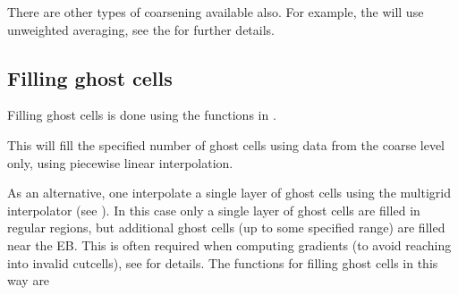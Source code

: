 \documentclass[letterpaper,10pt,english]{sphinxmanual}
\begin{document}
\sphinxAtStartPar
There are other types of coarsening available also.
For example, the  will use unweighted averaging, see the  for further details.


\subsection{Filling ghost cells}
\label{\detokenize{Source/MeshData:filling-ghost-cells}}\label{\detokenize{Source/MeshData:chap-ghostcells}}
\sphinxAtStartPar
Filling ghost cells is done using the  functions in {\hyperref[\detokenize{Source/AmrMesh:chap-amrmesh}]{}}.

\begin{sphinxVerbatim}[commandchars=\\\{\},formatcom=\scriptsize]
      

         
\end{sphinxVerbatim}

\sphinxAtStartPar
This will fill the specified number of ghost cells using data from the coarse level only, using piecewise linear interpolation.

\sphinxAtStartPar
As an alternative, one  interpolate a single layer of ghost cells using the multigrid interpolator (see {\hyperref[\detokenize{Source/LinearSolvers:chap-multigridinterpolation}]{}}).
In this case only a single layer of ghost cells are filled in regular regions, but additional ghost cells (up to some specified range) are filled near the EB.
This is often required when computing gradients (to avoid reaching into invalid cut\sphinxhyphen{}cells), see {\hyperref[\detokenize{Source/MeshData:chap-gradients}]{}} for details.
The functions for filling ghost cells in this way are
\end{document}
